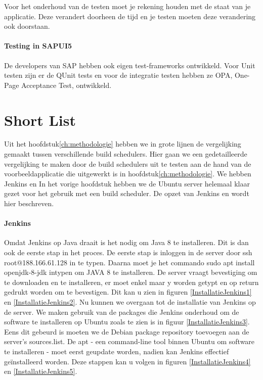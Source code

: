 Voor het onderhoud van de testen moet je rekening houden met de staat van je applicatie. Deze verandert doorheen de tijd en je testen moeten deze verandering ook doorstaan.

    \paragraph{Testing in SAPUI5}
    De developers van SAP hebben ook eigen test-frameworks ontwikkeld. Voor Unit testen zijn er de QUnit tests en voor de integratie testen hebben ze OPA, One-Page Acceptance Test, ontwikkeld.

\section{Short List}
\label{sec:short-list}
Uit het hoofdstuk\ref{ch:methodologie} hebben we in grote lijnen de vergelijking gemaakt tussen verschillende build schedulers. Hier gaan we een gedetailleerde vergelijking te maken door de build schedulers uit te testen aan de hand van de voorbeeldapplicatie die uitgewerkt is in hoofdstuk\ref{ch:methodologie}.
We hebben Jenkins en %
In het vorige hoofdstuk hebben we de Ubuntu server helemaal klaar gezet voor het gebruik met een build scheduler. De opzet van Jenkins en %
wordt hier beschreven.

    \paragraph{Jenkins}
    Omdat Jenkins op Java draait is het nodig om Java 8 te installeren. Dit is dan ook de eerste stap in het proces. 
    De eerste stap is inloggen in de server door ssh root@188.166.61.128 in te typen. Daarna moet je het commando sudo apt install openjdk-8-jdk intypen om JAVA 8 te installeren. De server vraagt bevestiging om te downloaden en te installeren, er moet enkel maar y worden getypt en op return gedrukt worden om te bevestigen. Dit kan u zien in figuren \ref{InstallatieJenkins1} en \ref{InstallatieJenkins2}.
    Nu kunnen we overgaan tot de installatie van Jenkins op de server. We maken gebruik van de packages die Jenkins onderhoud om de software te installeren op Ubuntu zoals te zien is in figuur \ref{InstallatieJenkins3}.
    Eens dit gebeurd is moeten we de Debian package repository toevoegen aan de server's sources.list.
    De apt - een command-line tool binnen Ubuntu om software te installeren - moet eerst geupdate worden, nadien kan Jenkins effectief geïnstalleerd worden. Deze stappen kan u volgen in figuren \ref{InstallatieJenkins4} en \ref{InstallatieJenkins5}.
    

